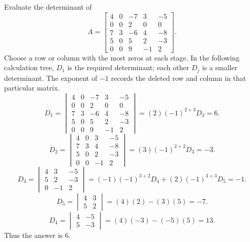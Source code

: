 \goal Evaluate the determinant of
\[A=\begin{bmatrix}4&0&-7&3&-5\\0&0&2&0&0\\7&3&-6&4&-8\\5&0&5&2&-3\\0&0&9&-1&2\end{bmatrix}.\]
Choose a row or column with the most zeros at each stage. In the following calculation tree, $D_{1}$ is the required determinant; each other $D_j$ is a smaller determinant. The exponent of $-1$ records the deleted row and column in that particular matrix.
\[
D_{1}=\begin{vmatrix}4&0&-7&3&-5\\0&0&2&0&0\\7&3&-6&4&-8\\5&0&5&2&-3\\0&0&9&-1&2\end{vmatrix}=(2)(-1)^{2+3}D_{2}=6.
\]
\[
D_{2}=\begin{vmatrix}4&0&3&-5\\7&3&4&-8\\5&0&2&-3\\0&0&-1&2\end{vmatrix}=(3)(-1)^{2+2}D_{3}=-3.
\]
\[
D_{3}=\begin{vmatrix}4&3&-5\\5&2&-3\\0&-1&2\end{vmatrix}=(-1)(-1)^{3+2}D_{4} + (2)(-1)^{3+3}D_{5}=-1.
\]
\[
D_{5}=\begin{vmatrix}4&3\\5&2\end{vmatrix}=(4)(2)-(3)(5)=-7.
\]
\[
D_{4}=\begin{vmatrix}4&-5\\5&-3\end{vmatrix}=(4)(-3)-(-5)(5)=13.
\]
Thus the answer is $6$.

